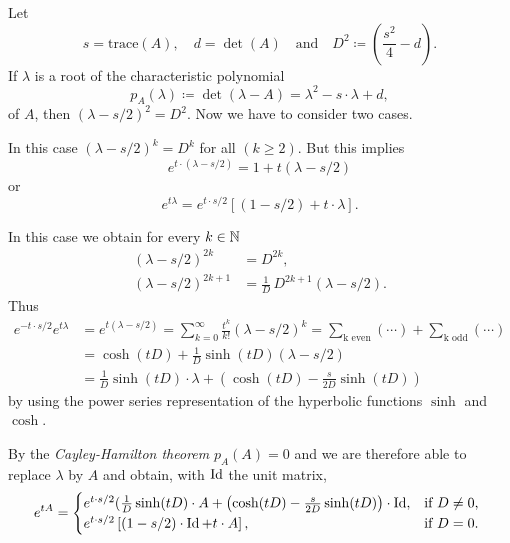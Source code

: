 Let %
\[
	s = \text{trace}(A), 
	\quad 
	d = \det(A) 
	\quad \text{and} \quad
	D^{2} \coloneqq \left( \frac{s^{2}}{4} - d \right).
\]
%
If $ \lambda $ is a root of the characteristic polynomial  
\[
p_A(\lambda) \coloneqq \det(\lambda - A) = \lambda^2-s\cdot \lambda + d , 
\]
of $ A $, then  $ \left( \lambda - s/2 \right)^{2} = D^{2} $.
Now we have to consider two cases.
\begin{description}[wide, labelindent=0em]

\item[$ D^{2} = 0 $: ] 
In this case $\left( \lambda - s/2 \right)^{k} = D^{k} $  for all $ (k \geq 2)$.
%
But this implies 
%
\[
	 e^{t \cdot \left( \lambda - s/2 \right)} = 1 + t( \lambda - s/2)
\]
%
or
%
\[
	e^{t \lambda } = e^{t\cdot s/2}[ ( 1 - s/2) + t \cdot \lambda] .
\]
%
\item[$ D^{2} \neq 0 $: ]
In this case we obtain for every $ k \in \mathbb{N} $
%
\begin{align*}
	( \lambda - s/2 )^{2k}  &= D^{2k}, \\ 
	( \lambda - s/2)^{2k+1} &=\frac{1}{D} \, D^{2k+1}( \lambda - s/2 ) .
\end{align*}
Thus  
\begin{align*}
	e^{ -t \cdot s/2 }e^{t \lambda} & = e^{t( \lambda - s/2 )} 
		= \sum_{k=0}^\infty \frac{t^k}{k!}( \lambda - s/2 )^k 
		= \sum_{ \text{k even} } (\cdots) + \sum_{ \text{k odd} } (\cdots)  \\
	&= \cosh( t D ) + \frac{1}{D} \sinh( t D )( \lambda - s/2 ) \\
	&= \frac{ 1 }{ D } \sinh( tD )\cdot \lambda + \left( \cosh(tD) - \frac{s}{2D} \sinh(tD) \right)
\end{align*}
by using the power series representation of the hyperbolic functions $ \sinh $ and $ \cosh $.
\end{description}
By the \emph{Cayley-Hamilton theorem} $p_{A}(A) = 0 $  and we are therefore able to replace 
$ \lambda $ by $ A $ and obtain, with $ \operatorname{Id} $ the unit matrix, 
\begin{equation*}\label{eq:exp-rep}
	e^{tA} =
	\begin{cases}
		e^{t \cdot s/2}( \frac{1}{D} \sinh(t D) \cdot A + 
			\left( \cosh(tD) - \frac{s}{2D} \sinh(tD) \right) \cdot \operatorname{Id}, & 
									\text{if $ D \neq 0 $, } \\
		e^{t \cdot s/2} \left[ ( 1 - s/2)\cdot \operatorname{Id} + t \cdot A \right], &
									\text{if $ D = 0 $.}
	\end{cases}
\end{equation*}
